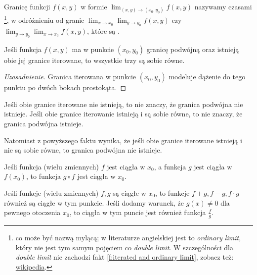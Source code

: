 Granicę funkcji $f(x, y)$ w formie $\lim_{(x, y) \to (x_0, y_0)} f(x, y)$ nazywamy czasami \footnote{co może być nazwą mylącą; w literaturze angielskiej jest to \textit{ordinary limit}, który nie jest tym samym pojęciem co \textit{double limit}. W szczególności dla \textit{double limit} nie zachodzi fakt \ref{f:iterated and ordinary limit}, zobacz też: \href{https://en.wikipedia.org/wiki/Iterated_limit\#Limit_of_function}{wikipedia}.}, w odróżnieniu od granic $\lim_{x\to x_0} \lim_{y\to y_0} f(x, y)$ czy $\lim_{y\to y_0} \lim_{x\to x_0} f(x, y)$, które są .

\begin{fact}
    \label{f:iterated and ordinary limit}
    Jeśli funkcja $f(x, y)$ ma w punkcie $(x_0, y_0)$ granicę podwójną oraz istnieją obie jej granice iterowane, to wszystkie trzy są sobie równe.
\end{fact}
\begin{proof}[Uzasadnienie]
    Granica iterowana w punkcie $(x_0, y_0)$ modeluje dążenie do tego punktu po dwóch bokach prostokąta.
\end{proof}

\begin{remark*}
    Jeśli obie granice iterowane nie istnieją, to nie znaczy, że granica podwójna nie istnieje. Jeśli obie granice iterowanie istnieją i są sobie równe, to nie znaczy, że granica podwójna istnieje.

    Natomiast z powyższego faktu wynika, że jeśli obie granice iterowane istnieją i nie są sobie równe, to granica podwójna nie istnieje.
\end{remark*}

\begin{fact}
    Jeśli funkcja (wielu zmiennych) $f$ jest ciągła w $x_0$, a funkcja $g$ jest ciągła w $f(x_0)$, to funkcja $g\circ f$ jest ciągła w $x_0$.
\end{fact}

\begin{fact}
    Jeśli funkcje (wielu zmiennych) $f, g$ są ciągłe w $x_0$, to funkcje $f+g, f-g, f\cdot g$ również są ciągłe w tym punkcie. Jeśli dodamy warunek, że $g(x) \neq 0$ dla pewnego otoczenia $x_0$, to ciągła w tym puncie jest również funkcja $\frac{f}{g}$.
\end{fact}